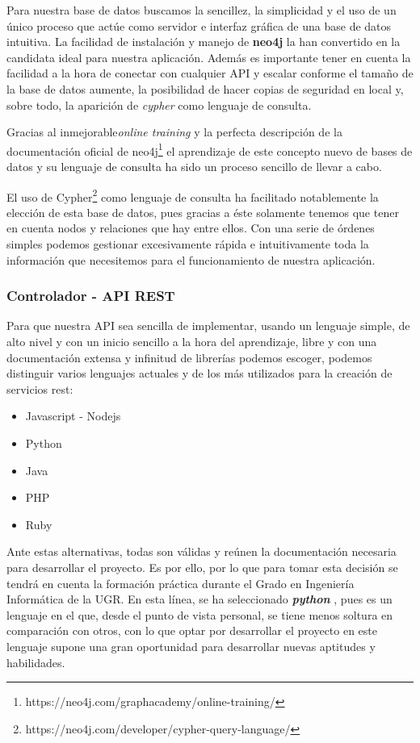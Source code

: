 Para nuestra base de datos buscamos la sencillez, la simplicidad y el uso de un único proceso que actúe como servidor e interfaz gráfica de una base de datos intuitiva. La facilidad de instalación y manejo de \textbf{neo4j} la han convertido en la candidata ideal para nuestra aplicación.  Además es importante tener en cuenta la facilidad a la hora de conectar con cualquier API y escalar conforme el tamaño de la base de datos aumente, la posibilidad de hacer copias de seguridad en local y, sobre todo, la aparición de \textit{cypher} como lenguaje de consulta\cite{neovstitan}.

Gracias al inmejorable\textit{online training} y la perfecta descripción de la documentación oficial de neo4j\footnote{https://neo4j.com/graphacademy/online-training/} el aprendizaje de este concepto nuevo de bases de datos y su lenguaje de consulta ha sido un proceso sencillo de llevar a cabo.

El uso de Cypher\footnote{https://neo4j.com/developer/cypher-query-language/} como lenguaje de consulta ha facilitado notablemente la elección de esta base de datos, pues gracias a éste solamente tenemos que tener en cuenta nodos y relaciones que hay entre ellos. Con una serie de órdenes simples podemos gestionar excesivamente rápida e intuitivamente toda la información que necesitemos para el funcionamiento de nuestra aplicación.

\subsubsection{Controlador - API REST}

Para que nuestra API sea sencilla de implementar, usando un lenguaje simple, de alto nivel y con un inicio sencillo a la hora del aprendizaje, libre y con una documentación extensa y infinitud de librerías podemos escoger, podemos distinguir varios lenguajes actuales y de los más utilizados para la creación de servicios rest\cite{apirest1}\cite{apirest2}\cite{apirest3}:

\begin{itemize}
    \item Javascript - Nodejs
    \item Python
    \item Java 
    \item PHP
    \item Ruby
\end{itemize}

Ante estas alternativas, todas son válidas y reúnen la documentación necesaria para desarrollar el proyecto. Es por ello, por lo que para tomar esta decisión se tendrá en cuenta la formación  práctica durante el Grado en Ingeniería Informática de la UGR. En esta línea, se ha seleccionado \textbf{\textit{python} }, pues es un lenguaje en el que, desde el punto de vista personal, se tiene menos soltura en comparación con otros, con lo que optar por desarrollar el proyecto en este lenguaje supone una gran oportunidad para desarrollar nuevas aptitudes y habilidades.

